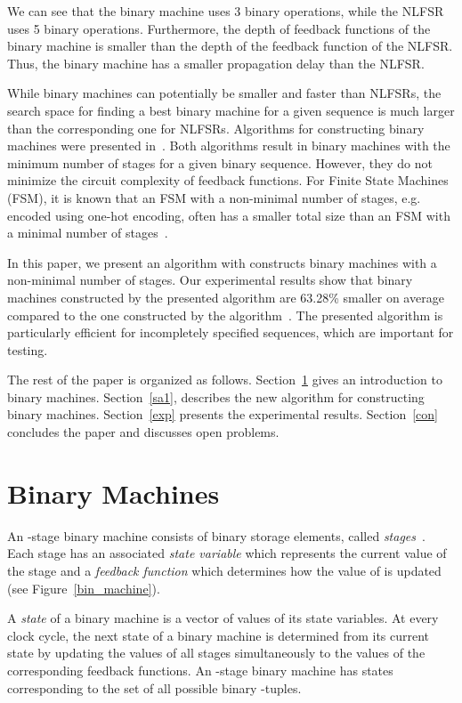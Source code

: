 \documentclass[10pt,conference]{IEEEtran}
\begin{document}
We can see that the binary machine uses 3 binary operations,
while the NLFSR uses 5 binary operations. Furthermore,
the depth of feedback functions of the binary machine is smaller than
the depth of the feedback function of the NLFSR. Thus, the
binary machine has a smaller propagation delay than the NLFSR.

While binary machines can potentially be smaller and faster than NLFSRs, 
the search space for finding a best binary machine for a given sequence
is much larger than the corresponding one for NLFSRs.
Algorithms for constructing binary machines 
were presented in~\cite{Du10aj,Du11a}. Both algorithms
result in binary machines with the minimum number of stages
for a given binary sequence. However, they do not minimize the circuit 
complexity of feedback functions.
For Finite State Machines (FSM), it is known that an FSM 
with a non-minimal number of stages, e.g. encoded
using one-hot encoding, often has a smaller total size
than an FSM with a minimal number of stages~\cite{MiBS85}.

In this paper, we present an algorithm with constructs binary machines
with a non-minimal number of stages.
Our experimental results show that binary machines 
constructed by the presented algorithm are 63.28\% smaller 
on average compared to the one constructed 
by the algorithm~\cite{Du11a}.
The presented algorithm is particularly efficient for incompletely specified sequences,
which are important for testing.


The rest of the paper is organized as follows. 
Section~\ref{bm} gives an introduction to binary machines.
Section~\ref{sa1}, describes the new algorithm for constructing binary
machines.  
Section~\ref{exp} presents the experimental results.
Section~\ref{con} concludes the paper and discusses open problems.

\section{Binary Machines} \label{bm}

An -stage binary machine consists of 
binary storage elements, called {\em stages}~\cite{Golomb_book}. 
Each stage  has an associated {\em state variable}  
which represents the current value of the stage  and a {\em feedback function} 
 which determines how the value of  is updated (see Figure~\ref{bin_machine}).

A {\em state} of a binary machine is a vector of values of its
state variables. At every clock cycle, 
the next state of a binary machine is determined from its current state 
by updating the values of all stages simultaneously
to the values of the corresponding feedback functions.
An -stage binary machine has  states corresponding to the 
set  of all possible binary -tuples.
\end{document}
